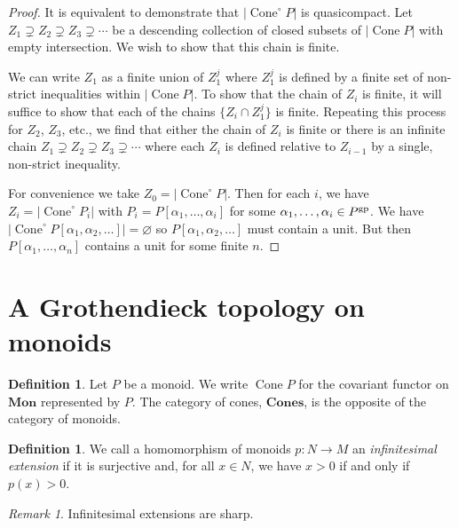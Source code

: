 \documentclass[12pt]{amsart}
\theoremstyle{definition}
\newtheorem{definition}[theorem]{Definition}
\theoremstyle{remark}
\newtheorem{remark}[theorem]{Remark}
\def\Mon{\mathbf{Mon}}
\def\Cone{\operatorname{Cone}}
\def\Cones{\mathbf{Cones}}
\begin{document}
\begin{proof}
It is equivalent to demonstrate that $|\Cone^\circ P|$ is quasicompact.  Let $Z_1 \supsetneq Z_2 \supsetneq Z_3 \supsetneq \cdots$ be a descending collection of closed subsets of $|\Cone P|$ with empty intersection.  We wish to show that this chain is finite.

We can write $Z_1$ as a finite union of $Z_1^j$ where $Z_1^j$ is defined by a finite set of non-strict inequalities within $| \Cone P |$.  To show that the chain of $Z_i$ is finite, it will suffice to show that each of the chains $\{ Z_i \cap Z_1^j \}$ is finite.  Repeating this process for $Z_2$, $Z_3$, etc., we find that either the chain of $Z_i$ is finite or there is an infinite chain $Z_1 \supsetneq Z_2 \supsetneq Z_3 \supsetneq \cdots$ where each $Z_i$ is defined relative to $Z_{i-1}$ by a single, non-strict inequality.

For convenience we take $Z_0 = |\Cone^\circ P|$.  Then for each $i$, we have $Z_i = |\Cone^\circ P_i|$ with $P_i = P[\alpha_1, \ldots, \alpha_i]$ for some $\alpha_1, \ldots, \alpha_i \in P^{\rm gp}$.  We have $|\Cone^\circ P[\alpha_1, \alpha_2, \ldots]| = \varnothing$ so $P[\alpha_1, \alpha_2, \ldots]$ must contain a unit.  But then $P[\alpha_1, \ldots, \alpha_n]$ contains a unit for some finite $n$.
\end{proof}

\section{A Grothendieck topology on monoids}

\begin{definition}
Let $P$ be a monoid.  We write $\Cone P$ for the covariant functor on $\Mon$ represented by $P$.  The category of cones, $\Cones$, is the opposite of the category of monoids. 
\end{definition}

\begin{definition}
We call a homomorphism of monoids $p : N \to M$ an \emph{infinitesimal extension} if it is surjective and, for all $x \in N$, we have $x > 0$ if and only if $p(x) > 0$.
\end{definition}

\begin{remark} \label{rem:sharp}
Infinitesimal extensions are sharp.
\end{remark}
\end{document}
